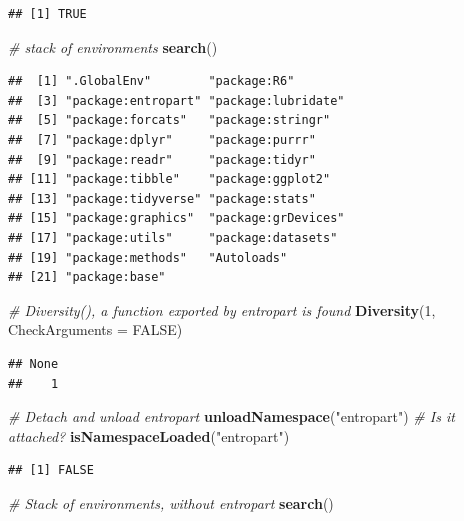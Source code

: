 \documentclass[
  12pt,
  american,
  a4paper,
  extrafontsizes,onecolumn,openright
  ]{memoir}
\newenvironment{Shaded}{\begin{snugshade}}{\end{snugshade}}
\newcommand{\AttributeTok}[1]{\textcolor[rgb]{0.13,0.29,0.53}{#1}}
\newcommand{\CommentTok}[1]{\textcolor[rgb]{0.56,0.35,0.01}{\textit{#1}}}
\newcommand{\ConstantTok}[1]{\textcolor[rgb]{0.56,0.35,0.01}{#1}}
\newcommand{\DecValTok}[1]{\textcolor[rgb]{0.00,0.00,0.81}{#1}}
\newcommand{\FunctionTok}[1]{\textcolor[rgb]{0.13,0.29,0.53}{\textbf{#1}}}
\newcommand{\NormalTok}[1]{#1}
\newcommand{\StringTok}[1]{\textcolor[rgb]{0.31,0.60,0.02}{#1}}
\begin{document}
\begin{verbatim}
## [1] TRUE
\end{verbatim}

\begin{Shaded}
\begin{Highlighting}[]
\CommentTok{\# stack of environments}
\FunctionTok{search}\NormalTok{()}
\end{Highlighting}
\end{Shaded}

\begin{verbatim}
##  [1] ".GlobalEnv"        "package:R6"       
##  [3] "package:entropart" "package:lubridate"
##  [5] "package:forcats"   "package:stringr"  
##  [7] "package:dplyr"     "package:purrr"    
##  [9] "package:readr"     "package:tidyr"    
## [11] "package:tibble"    "package:ggplot2"  
## [13] "package:tidyverse" "package:stats"    
## [15] "package:graphics"  "package:grDevices"
## [17] "package:utils"     "package:datasets" 
## [19] "package:methods"   "Autoloads"        
## [21] "package:base"
\end{verbatim}

\begin{Shaded}
\begin{Highlighting}[]
\CommentTok{\# Diversity(), a function exported by entropart is found}
\FunctionTok{Diversity}\NormalTok{(}\DecValTok{1}\NormalTok{, }\AttributeTok{CheckArguments =} \ConstantTok{FALSE}\NormalTok{)}
\end{Highlighting}
\end{Shaded}

\begin{verbatim}
## None 
##    1
\end{verbatim}

\begin{Shaded}
\begin{Highlighting}[]
\CommentTok{\# Detach and unload entropart}
\FunctionTok{unloadNamespace}\NormalTok{(}\StringTok{"entropart"}\NormalTok{)}
\CommentTok{\# Is it attached?}
\FunctionTok{isNamespaceLoaded}\NormalTok{(}\StringTok{"entropart"}\NormalTok{)}
\end{Highlighting}
\end{Shaded}

\begin{verbatim}
## [1] FALSE
\end{verbatim}

\begin{Shaded}
\begin{Highlighting}[]
\CommentTok{\# Stack of environments, without entropart}
\FunctionTok{search}\NormalTok{()}
\end{Highlighting}
\end{Shaded}
\end{document}
